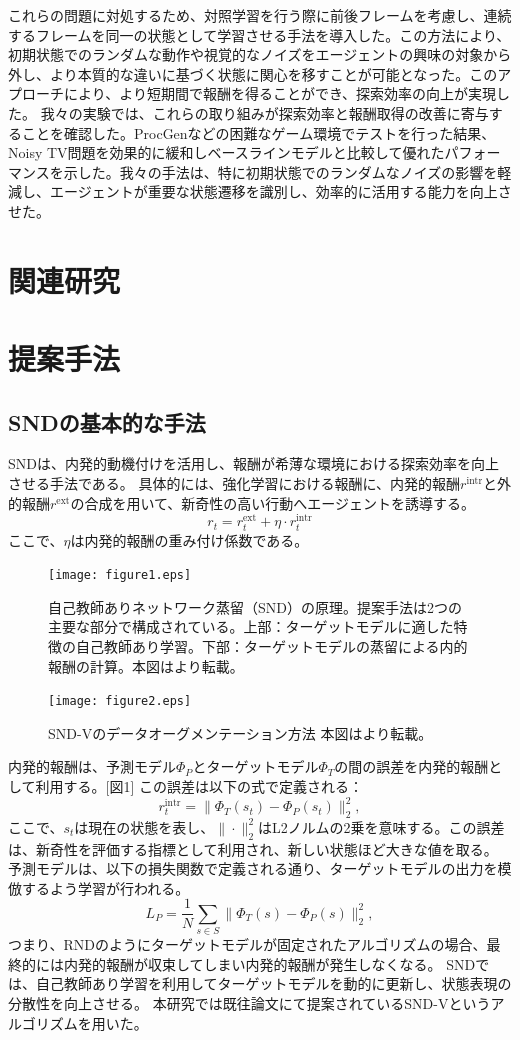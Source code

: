これらの問題に対処するため、対照学習を行う際に前後フレームを考慮し、連続するフレームを同一の状態として学習させる手法を導入した。この方法により、初期状態でのランダムな動作や視覚的なノイズをエージェントの興味の対象から外し、より本質的な違いに基づく状態に関心を移すことが可能となった。このアプローチにより、より短期間で報酬を得ることができ、探索効率の向上が実現した。
我々の実験では、これらの取り組みが探索効率と報酬取得の改善に寄与することを確認した。ProcGenなどの困難なゲーム環境でテストを行った結果、Noisy TV問題を効果的に緩和しベースラインモデルと比較して優れたパフォーマンスを示した。我々の手法は、特に初期状態でのランダムなノイズの影響を軽減し、エージェントが重要な状態遷移を識別し、効率的に活用する能力を向上させた。

\section{関連研究}

\section{提案手法}
\subsection{SNDの基本的な手法}
SNDは、内発的動機付けを活用し、報酬が希薄な環境における探索効率を向上させる手法である。
具体的には、強化学習における報酬に、内発的報酬\(r^{\text{intr}}\)と外的報酬\(r^{\text{ext}}\)の合成を用いて、新奇性の高い行動へエージェントを誘導する。
\[
 r_t = r^{\text{ext}}_{t} + \eta \cdot r^{\text{intr}}_{t}
\]
ここで、\(\eta\)は内発的報酬の重み付け係数である。
\begin{figure}[t]
   \centering
   \texttt{[image: figure1.eps]}
   \caption{自己教師ありネットワーク蒸留（SND）の原理。提案手法は2つの主要な部分で構成されている。上部：ターゲットモデルに適した特徴の自己教師あり学習。下部：ターゲットモデルの蒸留による内的報酬の計算。本図は\cite{引用元}より転載。}\label{fig:figure1}
\end{figure}
\begin{figure}[t]
   \centering
   \texttt{[image: figure2.eps]}
   \caption{SND-Vのデータオーグメンテーション方法 本図は\cite{引用元}より転載。}\label{fig:figure2}
\end{figure}


内発的報酬は、予測モデル\(\Phi_P\)とターゲットモデル\(\Phi_T\)の間の誤差を内発的報酬として利用する。[図1]
この誤差は以下の式で定義される：
\[
 r^{\text{intr}}_{t} = \| \Phi_T(s_t) - \Phi_P(s_t) \|_2^2,
\]
ここで、\(s_t\)は現在の状態を表し、\(\|\cdot\|_2^2\)はL2ノルムの2乗を意味する。この誤差は、新奇性を評価する指標として利用され、新しい状態ほど大きな値を取る。
予測モデルは、以下の損失関数で定義される通り、ターゲットモデルの出力を模倣するよう学習が行われる。
\[
 L_P = \frac{1}{N} \sum_{s \in S} \| \Phi_T(s) - \Phi_P(s) \|_2^2,
\]
つまり、RNDのようにターゲットモデルが固定されたアルゴリズムの場合、最終的には内発的報酬が収束してしまい内発的報酬が発生しなくなる。
SNDでは、自己教師あり学習を利用してターゲットモデルを動的に更新し、状態表現の分散性を向上させる。
本研究では既往論文にて提案されているSND-Vというアルゴリズムを用いた。

